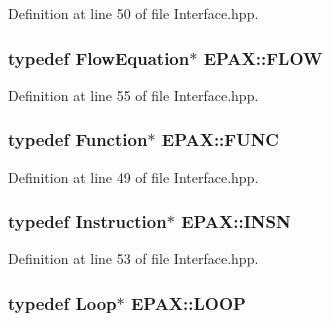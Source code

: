 \-Definition at line 50 of file \-Interface.\-hpp.

\hypertarget{namespace_e_p_a_x_a289a37f4d34ed51ee92cbd8c601db421}{
\subsubsection[{\-F\-L\-O\-W}]{\setlength{\rightskip}{0pt plus 5cm}typedef \-Flow\-Equation$\ast$ {\bf \-E\-P\-A\-X\-::\-F\-L\-O\-W}}}\label{namespace_e_p_a_x_a289a37f4d34ed51ee92cbd8c601db421}


\-Definition at line 55 of file \-Interface.\-hpp.

\hypertarget{namespace_e_p_a_x_a5b05cc89d633ec2241cb3af828c03024}{
\subsubsection[{\-F\-U\-N\-C}]{\setlength{\rightskip}{0pt plus 5cm}typedef {\bf \-Function}$\ast$ {\bf \-E\-P\-A\-X\-::\-F\-U\-N\-C}}}\label{namespace_e_p_a_x_a5b05cc89d633ec2241cb3af828c03024}


\-Definition at line 49 of file \-Interface.\-hpp.

\hypertarget{namespace_e_p_a_x_a601da5f2ead9a877d566da6cfc9026eb}{
\subsubsection[{\-I\-N\-S\-N}]{\setlength{\rightskip}{0pt plus 5cm}typedef {\bf \-Instruction}$\ast$ {\bf \-E\-P\-A\-X\-::\-I\-N\-S\-N}}}\label{namespace_e_p_a_x_a601da5f2ead9a877d566da6cfc9026eb}


\-Definition at line 53 of file \-Interface.\-hpp.

\hypertarget{namespace_e_p_a_x_ac236645423e99e8ccc784040ff1f881e}{
\subsubsection[{\-L\-O\-O\-P}]{\setlength{\rightskip}{0pt plus 5cm}typedef {\bf \-Loop}$\ast$ {\bf \-E\-P\-A\-X\-::\-L\-O\-O\-P}}}\label{namespace_e_p_a_x_ac236645423e99e8ccc784040ff1f881e}


